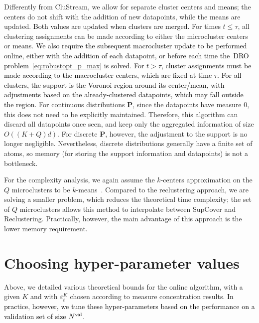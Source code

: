 \documentclass[12pt]{article}
\newcommand{\prob}{{\mathbf P}}
\newcommand{\eps}{\varepsilon^K}
\newcommand{\RC}[1]{\textcolor{black}{#1}}
\newcommand{\RC}[1]{\textcolor{blue}{#1}}
\begin{document}
Differently from CluStream, we allow for separate cluster centers and \RC{means}; the centers do not shift with the addition of new datapoints, while the \RC{means} are updated. \RC{Both values are updated when clusters are merged.} 
For times $t \leq \tau$, all clustering assignments can be made according to either the microcluster centers or \RC{means}. 
\RC{We also require the subsequent macrocluster update to be performed online, either with the addition of each datapoint, or before each time the~\gls{DRO} problem~\eqref{eq:robustopt_p_max} is solved.}
\RC{For $t > \tau$, cluster assignments must be made according to the macrocluster centers, which are fixed at time $\tau$.}
\RC{For all clusters, the support is the Voronoi region around its center/\RC{mean}, with adjustments based on the already-clustered datapoints, which may fall outside the region.} For continuous distributions $\prob$, since the datapoints have measure 0, this does not need to be explicitly maintained. 
Therefore, this algorithm can discard all datapoints once seen, and keep only the aggregated information of size $O((K+Q)d)$. 
For discrete $\prob$, however, the adjustment to the support is no longer negligible. Nevertheless, discrete distributions generally have a finite set of atoms, so memory (for storing the support information and datapoints) is not a bottleneck. 


For the complexity analysis, we again assume the $k$-centers approximation on the $Q$ microclusters to be $k$-means~\cite{kmeans}. Compared to the reclustering approach, we are solving a smaller problem, which reduces the theoretical time complexity\ifpreprint; the set of $Q$ microclusters allows this method to interpolate between SupCover and Reclustering\fi. 
Practically, however, the main advantage of this approach is the lower memory requirement. 



\section{Choosing hyper-parameter values}
\label{sec:hyper_param}
Above, we detailed various theoretical bounds for the online algorithm, with a given $K$ and with $\eps_t$ chosen according to measure concentration results. 
\RC{In practice, however, we tune these hyper-parameters based on the performance on a validation set of size $N^{\rm val}$.} %


\end{document}
